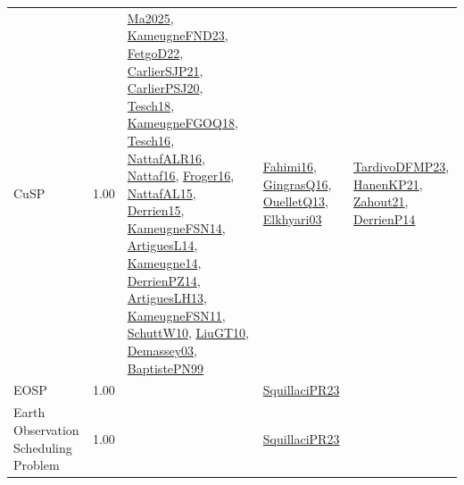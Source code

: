 {\begin{longtable}{p{3cm}r>{\raggedright\arraybackslash}p{6cm}>{\raggedright\arraybackslash}p{6cm}>{\raggedright\arraybackslash}p{8cm}}
\index{CuSP}\index{Classification!CuSP}CuSP &  1.00 & \hyperref[detail:Ma2025]{Ma2025}, \hyperref[detail:KameugneFND23]{KameugneFND23}, \hyperref[detail:FetgoD22]{FetgoD22}, \hyperref[detail:CarlierSJP21]{CarlierSJP21}, \hyperref[detail:CarlierPSJ20]{CarlierPSJ20}, \hyperref[detail:Tesch18]{Tesch18}, \hyperref[detail:KameugneFGOQ18]{KameugneFGOQ18}, \hyperref[detail:Tesch16]{Tesch16}, \hyperref[detail:NattafALR16]{NattafALR16}, \hyperref[detail:Nattaf16]{Nattaf16}, \hyperref[detail:Froger16]{Froger16}, \hyperref[detail:NattafAL15]{NattafAL15}, \hyperref[detail:Derrien15]{Derrien15}, \hyperref[detail:KameugneFSN14]{KameugneFSN14}, \hyperref[detail:ArtiguesL14]{ArtiguesL14}, \hyperref[detail:Kameugne14]{Kameugne14}, \hyperref[detail:DerrienPZ14]{DerrienPZ14}, \hyperref[detail:ArtiguesLH13]{ArtiguesLH13}, \hyperref[detail:KameugneFSN11]{KameugneFSN11}, \hyperref[detail:SchuttW10]{SchuttW10}, \hyperref[detail:LiuGT10]{LiuGT10}, \hyperref[detail:Demassey03]{Demassey03}, \hyperref[detail:BaptistePN99]{BaptistePN99} & \hyperref[detail:Fahimi16]{Fahimi16}, \hyperref[detail:GingrasQ16]{GingrasQ16}, \hyperref[detail:OuelletQ13]{OuelletQ13}, \hyperref[detail:Elkhyari03]{Elkhyari03} & \hyperref[detail:TardivoDFMP23]{TardivoDFMP23}, \hyperref[detail:HanenKP21]{HanenKP21}, \hyperref[detail:Zahout21]{Zahout21}, \hyperref[detail:DerrienP14]{DerrienP14}\\
\index{EOSP}\index{Classification!EOSP}EOSP &  1.00 &  & \hyperref[detail:SquillaciPR23]{SquillaciPR23} & \\
\index{Earth Observation Scheduling Problem}\index{Classification!Earth Observation Scheduling Problem}Earth Observation Scheduling Problem &  1.00 &  & \hyperref[detail:SquillaciPR23]{SquillaciPR23} & \\

\end{longtable}}

